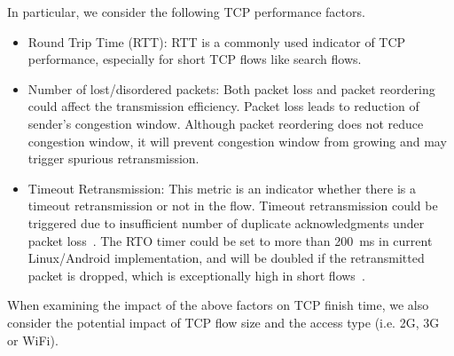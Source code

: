 In particular, we consider the following TCP performance factors. 

\begin{itemize}
	\item {Round Trip Time (RTT): } RTT is a commonly used indicator of TCP performance, especially for short TCP flows like search flows.
	

	\item {Number of lost/disordered packets: } Both packet loss and packet reordering could affect the transmission efficiency. Packet loss leads to reduction of sender's congestion window. Although packet reordering does not reduce congestion window, it will prevent congestion window from growing and may trigger spurious retransmission. \\
	
	\item {Timeout Retransmission: } This metric is an indicator whether there is a timeout retransmission or not in the flow. Timeout retransmission could be triggered due to insufficient number of duplicate acknowledgments under packet loss~\cite{rfc6675}. The RTO timer could be set to more than 200~ms in current Linux/Android implementation, and will be doubled if the retransmitted packet is dropped, which is exceptionally high in short flows~\cite{flach2013reducing}.\\
	
\end{itemize}

When examining the impact of the above factors on TCP finish time, we also consider the potential impact of TCP flow size and the access type (i.e. 2G, 3G or WiFi). 

